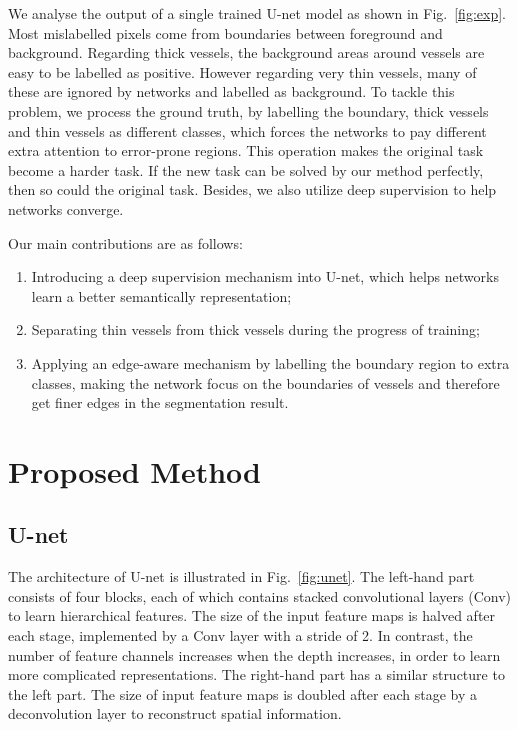 \documentclass[runningheads,a4paper]{llncs}
\begin{document}
We analyse the output of a single trained U-net model as shown in Fig.~\ref{fig:exp}. Most mislabelled pixels come from boundaries between foreground and background. Regarding thick vessels, the background areas around vessels are easy to be labelled as positive. However regarding very thin vessels, many of these are ignored by networks and labelled as background. To tackle this problem, we process the ground truth, by labelling the boundary, thick vessels and thin vessels as different classes, which forces the networks to pay different extra attention to error-prone regions. This operation makes the original task become a harder task. If the new task can be solved by our method perfectly, then so could the original task. Besides, we also utilize deep supervision to help networks converge. 

Our main contributions are as follows:
\vspace{-5pt}
\begin{enumerate}
	\item Introducing a deep supervision mechanism into U-net, which helps networks learn a better semantically representation;
	
	\item Separating thin vessels from thick vessels during the progress of training;
	
	\item Applying an edge-aware mechanism by labelling the boundary region to extra classes, making the network focus on the boundaries of vessels and therefore get finer edges in the segmentation result.
\end{enumerate}

\section{Proposed Method}

\subsection{U-net}

The architecture of U-net is illustrated in Fig.~\ref{fig:unet}. The left-hand part consists of four blocks, each of which contains stacked convolutional layers (Conv) to learn hierarchical features. The size of the input feature maps is halved after each stage, implemented by a Conv layer with a stride of 2. In contrast, the number of feature channels increases when the depth increases, in order to learn more complicated representations. The right-hand part has a similar structure to the left part. The size of input feature maps is doubled after each stage by a deconvolution layer to reconstruct spatial information.
\end{document}

